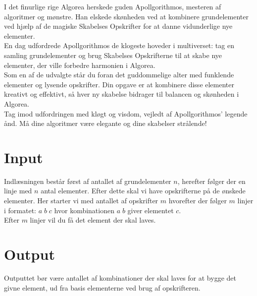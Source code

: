 I det finurlige rige Algorea herskede guden Apollgorithmos, mesteren af algoritmer og mønstre. Han elskede skønheden ved at kombinere grundelementer ved hjælp af de magiske Skabelses Opskrifter for at danne vidunderlige nye elementer.\\
En dag udfordrede Apollgorithmos de klogeste hoveder i multiverset: tag en samling grundelementer og brug Skabelses Opskrifterne til at skabe nye elementer, der ville forbedre harmonien i Algorea.\\
Som en af de udvalgte står du foran det guddommelige alter med funklende elementer og lysende opskrifter. Din opgave er at kombinere disse elementer kreativt og effektivt, så hver ny skabelse bidrager til balancen og skønheden i Algorea.\\
Tag imod udfordringen med kløgt og visdom, vejledt af Apollgorithmos' legende ånd. Må dine algoritmer være elegante og dine skabelser strålende!


\section*{Input}
Indlæsningen består først af antallet af grundelementer \(n\), herefter følger der en linje med \(n\) antal elementer.
Efter dette skal vi have opskrifterne på de ønskede elementer. Her starter vi med antallet af opskrifter \(m\) hvorefter der følger \(m\) linjer i formatet: \(a\;b\;c\) hvor kombinationen \(a\;b\) giver elementet \(c\).\\
Efter \(m\) linjer vil du få det element der skal laves.
\section*{Output}
Outputtet bør være antallet af kombinationer der skal laves for at bygge det givne element, ud fra basis elementerne ved brug af opskrifteren.
